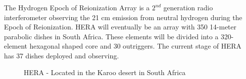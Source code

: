 \documentclass[a0,landscape]{a0poster}
\begin{document}
\begin{multicols}{4}
The Hydrogen Epoch of Reionization Array is a $2^{nd}$ generation radio interferometer observing the 21 cm emission from neutral hydrogen during the Epoch of Reionization. HERA will eventually be an array with 350 14-meter parabolic dishes in South Africa. These elements will be divided into a 320-element hexagonal shaped core and 30 outriggers. The current stage of HERA has 37 dishes deployed and observing. 


\begin{figure}[H]
\centering
\label{fig:HERA}
\caption{HERA - Located in the Karoo desert in South Africa}
\end{figure}


\end{multicols}
\end{document}
